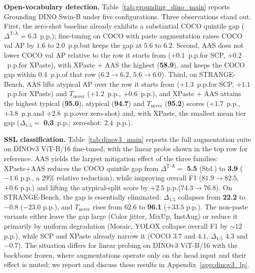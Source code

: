 \noindent\textbf{Open-vocabulary detection.}
Table~\ref{tab:grounding_dino_main} reports Grounding DINO Swin-B
under five configurations. Three observations stand out. First,
the zero-shot baseline already exhibits a substantial COCO quintile
gap ($\Delta^{\text{T-A}} = 6.3$~p.p.\@); fine-tuning on COCO with paste augmentation raises COCO val AP by $1.6$ to $2.0$~p.p.\@ but keeps the gap at $5.6$ to $6.2$. Second, AAS does not lower COCO val AP relative to the row it starts from ($+0.1$~p.p.\@ for SCP, $+0.2$~p.p.\@ for XPaste), with XPaste + AAS the highest (\textbf{58.9}), and keeps the COCO gap within $0.4$~p.p.\@ of that row ($6.2 \rightarrow 6.2$, $5.6 \rightarrow 6.0$). Third,
on STRANGE-Bench, AAS lifts atypical AP over the row it starts from ($+1.3$~p.p.\@ for SCP, $+1.1$~p.p.\@ for XPaste) and $T_{\text{never}}$ ($+1.2$~p.p.\@, $+0.6$~p.p.\@), and XPaste + AAS attains the highest typical (\textbf{95.0}), atypical (\textbf{94.7}) and $T_{\text{never}}$ (\textbf{95.2}) scores ($+1.7$~p.p.\@, $+3.8$~p.p.\@ and $+2.8$~p.p.\@ over zero-shot) and, with XPaste, the smallest mean tier gap ($\Delta_{1\text{-}5} = $ \textbf{0.3}~p.p.\@; zero-shot: $2.4$~p.p.\@). 





\noindent\textbf{SSL classification.}
Table~\ref{tab:dinov3_main} reports the full augmentation suite on
DINOv3 ViT-B/16 fine-tuned, with the linear probe shown in the top
row for reference. AAS yields the largest mitigation effect of the
three families: XPaste+AAS reduces the COCO quintile gap from
$\Delta^{\text{T-A}} = $ \textbf{5.5} (Std.) to \textbf{3.9} ($-1.6$
p.p.\@, a 29\% relative reduction), while improving overall F1
($81.9 \rightarrow 82.5$, $+0.6$ p.p.\@) and lifting the atypical-split
score by $+2.5$ p.p.\@ ($74.3 \rightarrow 76.8$). On STRANGE-Bench, the
gap is essentially eliminated: $\Delta_{1\text{-}5}$ collapses from
\textbf{22.2} to \textbf{$-0.8$} ($-23.0$ p.p.\@), and $T_{\text{never}}$
rises from $62.6$ to \textbf{96.1} ($+33.5$ p.p.\@). The non-paste variants
either leave the gap large (Color jitter, MixUp, InstAug) or reduce
it primarily by uniform degradation (Mosaic, YOLOX collapse overall
F1 by $\sim 12$ p.p.\@), while SCP and XPaste already narrow it (COCO $3.7$ and $4.1$, $\Delta_{1\text{-}5}$ $4.3$ and $-0.7$).
The situation differs for linear probing on DINOv3 ViT-B/16 with the backbone frozen, where augmentations operate only on the head input and their effect is muted; we report and discuss these results in Appendix~\ref{app:dinov3_lp}.

